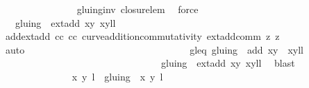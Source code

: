 \begin{isabellebody}
\ \ \ \ \ \ \ \ \ \ \ \ \ \ \isamarkupfalse%
\ gluing{\isacharunderscore}inv\ closure{\isacharunderscore}lem\ \isamarkupfalse%
\ force\isanewline
\ \ \ \ \ \ \ \ \ \ \ \ \isamarkupfalse%
\ \isamarkupfalse%
\ {\isachardoublequoteopen}{\isachardot}{\isachardot}{\isachardot}\ {\isacharequal}\ gluing\ {\isacharbackquote}{\isacharbackquote}\ {\isacharbraceleft}{\isacharparenleft}ext{\isacharunderscore}add\ {\isacharparenleft}x{\isacharcomma}y{\isacharparenright}\ {\isacharparenleft}x{\isacharprime}{\isacharcomma}y{\isacharprime}{\isacharparenright}{\isacharcomma}l{\isacharplus}l{\isacharprime}{\isacharparenright}{\isacharbraceright}{\isachardoublequoteclose}\isanewline
\ \ \ \ \ \ \ \ \ \ \ \ \ \ \isamarkupfalse%
\ add{\isacharunderscore}ext{\isacharunderscore}add\ cc{\isacharparenleft}{}{\isacharparenright}\ cc{\isacharparenleft}{}{\isacharparenright}\ curve{\isacharunderscore}addition{\isachardot}commutativity\ ext{\isacharunderscore}add{\isacharunderscore}comm\ z{}{\isacharparenleft}{}{\isacharparenright}\ z{}{\isacharparenleft}{}{\isacharparenright}\ \isamarkupfalse%
\ auto\ \ \ \ \ \ \ \ \ \ \ \ \ \ \ \ \ \ \isanewline
\ \ \ \ \ \ \ \ \ \ \ \ \isamarkupfalse%
\ \isamarkupfalse%
\ gl{\isacharunderscore}eq{\isacharcolon}\ {\isachardoublequoteopen}gluing\ {\isacharbackquote}{\isacharbackquote}\ {\isacharbraceleft}{\isacharparenleft}{\isacharparenleft}add\ {\isacharparenleft}x{\isacharcomma}y{\isacharparenright}\ {\isacharparenleft}{\isasymtau}\ {\isacharparenleft}x{\isacharprime}{\isacharcomma}y{\isacharprime}{\isacharparenright}{\isacharparenright}{\isacharparenright}{\isacharcomma}l{\isacharplus}l{\isacharprime}{\isacharplus}{}{\isacharparenright}{\isacharbraceright}\ {\isacharequal}\ \isanewline
\ \ \ \ \ \ \ \ \ \ \ \ \ \ \ \ \ \ \ \ \ \ \ \ \ \ \ \ \ \ \ \ \ gluing\ {\isacharbackquote}{\isacharbackquote}\ {\isacharbraceleft}{\isacharparenleft}ext{\isacharunderscore}add\ {\isacharparenleft}x{\isacharcomma}y{\isacharparenright}\ {\isacharparenleft}x{\isacharprime}{\isacharcomma}y{\isacharprime}{\isacharparenright}{\isacharcomma}l{\isacharplus}l{\isacharprime}{\isacharparenright}{\isacharbraceright}{\isachardoublequoteclose}\ \isamarkupfalse%
\ blast\isanewline
\ \ \ \ \ \ \ \ \ \ \ \ \ \isamarkupfalse%
\ {\isachardoublequoteopen}{\isacharbraceleft}{\isacharparenleft}{\isacharparenleft}x{\isacharcomma}\ y{\isacharparenright}{\isacharcomma}\ l{\isacharparenright}{\isacharbraceright}\ {\isacharslash}{\isacharslash}\ gluing\ {\isacharequal}\ {\isacharbraceleft}{\isacharbraceleft}{\isacharparenleft}{\isacharparenleft}x{\isacharcomma}\ y{\isacharparenright}{\isacharcomma}\ l{\isacharparenright}{\isacharbraceright}{\isacharbraceright}{\isachardoublequoteclose}\isanewline

\end{isabellebody}
